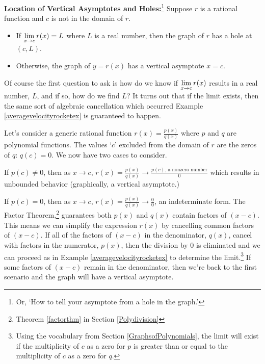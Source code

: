 \documentclass{ximera}
\begin{document}
\colorbox{ResultColor}{\bbm
\begin{thm}  \textbf{Location of Vertical Asymptotes and Holes:}\footnote{Or, `How to tell your asymptote from a hole in the graph.'}  \label{vavshole}  Suppose $r$ is a rational function and $c$ is not in the domain of $r$.  

\begin{itemize}

\item If $\ds{\lim_{x \rightarrow c} r(x) = L}$  where $L$ is a real number, then the graph of $r$ has a hole at $(c, L)$.

\item  Otherwise, the graph of $y = r(x)$ has a vertical asymptote $x = c$.

\end{itemize}

\end{thm}

\ebm}

Of course the first question to ask is how do we  know if $\ds{\lim_{x \rightarrow c} r(x)}$ results in a real number, $L$, and if so, how do we find $L$?  It turns out that if the limit exists, then the same sort of algebraic cancellation which occurred  Example \ref{averagevelocityrocketex} is guaranteed to happen. 

Let's consider a generic rational function $r(x) = \frac{p(x)}{q(x)}$ where $p$ and $q$ are polynomial functions.  The values `$c$' excluded from the domain of $r$ are the zeros of $q$:  $q(c) =0$. We now have two cases to consider.   

If $p(c) \neq 0$, then as $x \rightarrow c$, $r(x)  = \frac{p(x)}{q(x)} \rightarrow \frac{\text{$p(c)$, a nonzero number}}{0}$  which results in unbounded behavior (graphically, a vertical asymptote.)


If $p(c) = 0$, then  as $x \rightarrow c$, $r(x)  = \frac{p(x)}{q(x)} \rightarrow \frac{0}{0}$, an indeterminate form.  The Factor Theorem,\footnote{Theorem \ref{factorthm} in Section \ref{Polydivision}} guarantees both $p(x)$ and $q(x)$ contain factors of $(x-c)$.  This means we can simplify the expression $r(x)$ by cancelling common factors of $(x-c)$.  If all of the factors of $(x-c)$ in the denominator, $q(x)$, cancel with factors in the numerator, $p(x)$, then the division by $0$ is eliminated and we can proceed as in Example \ref{averagevelocityrocketex} to determine the limit.\footnote{Using the vocabulary from Section \ref{GraphsofPolynomials}, the limit will exist if the multiplicity of $c$ as a zero for $p$ is greater than or equal to the multiplicity of $c$ as a zero for $q$.}  If some factors of $(x-c)$ remain in the denominator, then we're back to the first scenario and the graph will have a vertical asymptote. 
\end{document}
